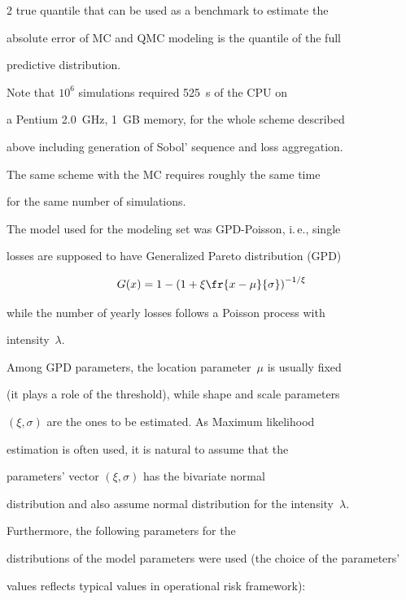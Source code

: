 \begin{multicols}{2}
true quantile that can be used as a benchmark to estimate the

absolute error of MC and QMC modeling is the quantile of the full

predictive distribution.



\medskip





Note that $10^6$ simulations required 525~s of the CPU on

a Pentium 2.0~GHz, 1~GB memory, for the whole scheme described

above including generation of Sobol' sequence and loss aggregation.

The same scheme with the MC requires roughly the same time

for the same number of simulations.



The model used for the modeling set was GPD-Poisson, i.\,e., single

losses are supposed to have Generalized Pareto distribution (GPD)

$$

G(x)= 1-\left(1+\xi\fr{x-\mu}{\sigma}\right)^{-1/\xi}

$$

while the number of yearly losses follows a Poisson process with

intensity~$\lambda$.



Among GPD parameters, the location parameter~$\mu$ is usually fixed

(it plays a role of the threshold), while shape and scale parameters

$(\xi,\sigma)$ are the ones to be estimated. As Maximum likelihood

estimation is often used, it is natural to assume that the

parameters' vector $(\xi,\sigma)$ has the bivariate normal

distribution and also assume normal distribution for the intensity~$\lambda$.

Furthermore, the following parameters for the

distributions of the model parameters were used (the choice of the parameters'

values reflects typical values in operational risk framework):

\begin{itemize}


\end{itemize}
\end{multicols}
